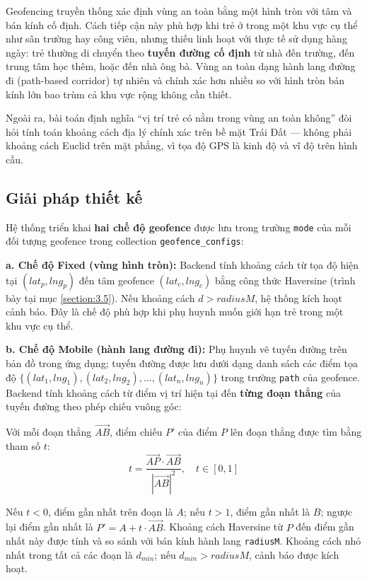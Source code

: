 \documentclass[../DoAn.tex]{subfiles}
\begin{document}
Geofencing truyền thống xác định vùng an toàn bằng một hình tròn với tâm và bán kính cố định. Cách tiếp cận này phù hợp khi trẻ ở trong một khu vực cụ thể như sân trường hay công viên, nhưng thiếu linh hoạt với thực tế sử dụng hàng ngày: trẻ thường di chuyển theo \textbf{tuyến đường cố định} từ nhà đến trường, đến trung tâm học thêm, hoặc đến nhà ông bà. Vùng an toàn dạng hành lang đường đi (path-based corridor) tự nhiên và chính xác hơn nhiều so với hình tròn bán kính lớn bao trùm cả khu vực rộng không cần thiết.

Ngoài ra, bài toán định nghĩa ``vị trí trẻ có nằm trong vùng an toàn không'' đòi hỏi tính toán khoảng cách địa lý chính xác trên bề mặt Trái Đất — không phải khoảng cách Euclid trên mặt phẳng, vì tọa độ GPS là kinh độ và vĩ độ trên hình cầu.

\subsection{Giải pháp thiết kế}

Hệ thống triển khai \textbf{hai chế độ geofence} được lưu trong trường \texttt{mode} của mỗi đối tượng geofence trong collection \texttt{geofence\_configs}:

\textbf{a. Chế độ Fixed (vùng hình tròn):} Backend tính khoảng cách từ tọa độ hiện tại $(lat_p, lng_p)$ đến tâm geofence $(lat_c, lng_c)$ bằng công thức Haversine (trình bày tại mục \ref{section:3.5}). Nếu khoảng cách $d > radiusM$, hệ thống kích hoạt cảnh báo. Đây là chế độ phù hợp khi phụ huynh muốn giới hạn trẻ trong một khu vực cụ thể.

\textbf{b. Chế độ Mobile (hành lang đường đi):} Phụ huynh vẽ tuyến đường trên bản đồ trong ứng dụng; tuyến đường được lưu dưới dạng danh sách các điểm tọa độ $\{(lat_1, lng_1), (lat_2, lng_2), \ldots, (lat_n, lng_n)\}$ trong trường \texttt{path} của geofence. Backend tính khoảng cách từ điểm vị trí hiện tại đến \textbf{từng đoạn thẳng} của tuyến đường theo phép chiếu vuông góc:

Với mỗi đoạn thẳng $\overrightarrow{AB}$, điểm chiếu $P'$ của điểm $P$ lên đoạn thẳng được tìm bằng tham số $t$:
\begin{equation}
t = \frac{\overrightarrow{AP} \cdot \overrightarrow{AB}}{|\overrightarrow{AB}|^2}, \quad t \in [0, 1]
\label{eq:projection}
\end{equation}

Nếu $t < 0$, điểm gần nhất trên đoạn là $A$; nếu $t > 1$, điểm gần nhất là $B$; ngược lại điểm gần nhất là $P' = A + t \cdot \overrightarrow{AB}$. Khoảng cách Haversine từ $P$ đến điểm gần nhất này được tính và so sánh với bán kính hành lang \texttt{radiusM}. Khoảng cách nhỏ nhất trong tất cả các đoạn là $d_{min}$; nếu $d_{min} > radiusM$, cảnh báo được kích hoạt.
\end{document}
